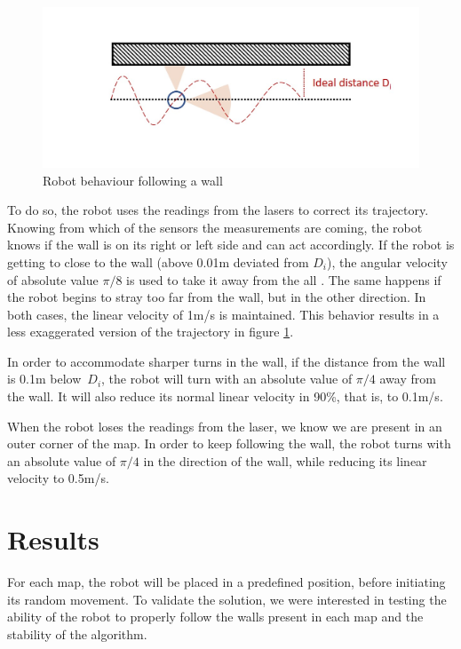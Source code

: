 \documentclass[10pt,journal,compsoc]{IEEEtran}
\begin{document}
\begin{figure}[thpb]
\centering
\includegraphics[scale=0.3]{img/behaviour.jpg}
\caption{Robot behaviour following a wall}
\label{fig:wall}
\end{figure}

To do so, the robot uses the readings from the lasers to correct its trajectory. Knowing from which of the sensors the measurements are coming, the robot knows if the wall is on its right or left side and can act accordingly. If the robot is getting to close to the wall (above 0.01m deviated from $D_i$), the angular velocity of absolute value $\pi/8$ is used to take it away from the all . The same happens if the robot begins to stray too far from the wall, but in the other direction. In both cases, the linear velocity of 1m/s is maintained. This behavior results in a less exaggerated version of the trajectory in figure \ref{fig:wall}.

In order to accommodate sharper turns in the wall, if the distance from the wall is 0.1m below~$D_i$, the robot will turn with an absolute value of $\pi/4$ away from the wall. It will also reduce its normal linear velocity in 90\%, that is, to 0.1m/s.

When the robot loses the readings from the laser, we know we are present in an outer corner of the map. In order to keep following the wall, the robot turns with an absolute value of $\pi/4$ in the direction of the wall, while reducing its linear velocity to 0.5m/s.

\section{Results}
For each map, the robot will be placed in a predefined position, before initiating its random movement. To validate the solution, we were interested in testing the ability of the robot to properly follow the walls present in each map and the stability of the algorithm.
\end{document}
